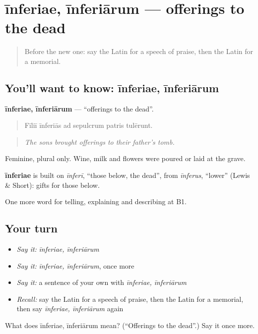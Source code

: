 \section[īnferiae, īnferiārum]{īnferiae, īnferiārum — offerings to the dead}

\label{lesson:LA-C331-inferiae}



\begin{quote}
Before the new one: say the Latin for a speech of praise, then the Latin for a memorial.
\end{quote}

\subsection*{You'll want to know: īnferiae, īnferiārum}
\textbf{īnferiae, īnferiārum} — \textquotedblleft{}offerings to the dead\textquotedblright{}.

\begin{quote}
Fīliī īnferiās ad sepulcrum patris tulērunt.
\end{quote}

\begin{quote}
\emph{The sons brought offerings to their father's tomb.}
\end{quote}

Feminine, plural only. Wine, milk and flowers were poured or laid at the grave.

\begin{cousinweb}
\textbf{īnferiae} is built on \emph{īnferī}, \textquotedblleft{}those below, the dead\textquotedblright{}, from \emph{īnferus}, \textquotedblleft{}lower\textquotedblright{} (Lewis \& Short): gifts for those below.
\end{cousinweb}

\begin{grammarlens}[title={What you've built}]
One more word for telling, explaining and describing at B1.
\end{grammarlens}

\subsection*{Your turn}
\begin{itemize}
\raggedright
  \item \emph{Say it:} \emph{īnferiae, īnferiārum}
  \item \emph{Say it:} \emph{īnferiae, īnferiārum}, once more
  \item \emph{Say it:} a sentence of your own with \emph{īnferiae, īnferiārum}
  \item \emph{Recall:} say the Latin for a speech of praise, then the Latin for a memorial, then say \emph{īnferiae, īnferiārum} again
\end{itemize}

\begin{tcolorbox}[breakable,colback=teal!4,colframe=teal!35!black,title={Before you move on}]
What does īnferiae, īnferiārum mean? (\textquotedblleft{}Offerings to the dead\textquotedblright{}.) Say it once more.
\end{tcolorbox}
